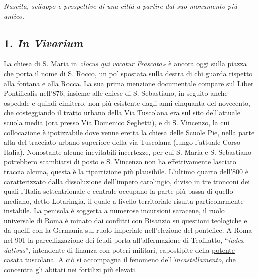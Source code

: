 \documentclass[
  letterpaper,
  DIV=11,
  numbers=noendperiod]{scrartcl}
\begin{document}
\emph{Nascita, sviluppo e prospettive di una città a partire dal suo
monumento più antico.}

\hypertarget{in-vivarium}{%
\subsection{\texorpdfstring{1. \emph{In
Vivarium}}{1. In Vivarium}}\label{in-vivarium}}

La chiesa di S. Maria in \emph{«locus qui vocatur Frascata»} è ancora
oggi sulla piazza che porta il nome di S. Rocco, un po' spostata sulla
destra di chi guarda rispetto alla fontana e alla Rocca. La sua prima
menzione documentale compare sul Liber Pontificalis nell'876, insieme
alle chiese di S. Sebastiano, in seguito anche ospedale e quindi
cimitero, non più esistente dagli anni cinquanta del novecento, che
costeggiando il tratto urbano della Via Tuscolana era sul sito
dell'attuale scuola media (ora presso Via Domenico Seghetti), e di S.
Vincenzo, la cui collocazione è ipotizzabile dove venne eretta la chiesa
delle Scuole Pie, nella parte alta del tracciato urbano superiore della
via Tuscolana (lungo l'attuale Corso Italia). Nonostante alcune
inevitabili incertezze, per cui S. Maria e S. Sebastiano potrebbero
scambiarsi di posto e S. Vincenzo non ha effettivamente lasciato traccia
alcuna, questa è la ripartizione più plausibile. L'ultimo quarto
dell'800 è caratterizzato dalla dissoluzione dell'impero carolingio,
diviso in tre tronconi dei quali l'Italia settentrionale e centrale
occupano la parte più bassa di quello mediano, detto Lotaringia, il
quale a livello territoriale risulta particolarmente instabile. La
penisola è soggetta a numerose incursioni saracene, il ruolo universale
di Roma è minato dai conflitti con Bisanzio su questioni teologiche e da
quelli con la Germania sul ruolo imperiale nell'elezione del pontefice.
A Roma nel 901 la parcellizzazione dei feudi porta all'affermazione di
Teofilatto, ``\emph{iudex dativus}'', intendente di finanza con poteri
militari, capostipite della
\href{2012-05-10-possedimenti-memorie-tuscolo-comandini.html}{potente
casata tuscolana}. A ciò si accompagna il fenomeno
dell\emph{'incastellamento}, che concentra gli abitati nei fortilizi più
elevati.
\end{document}
